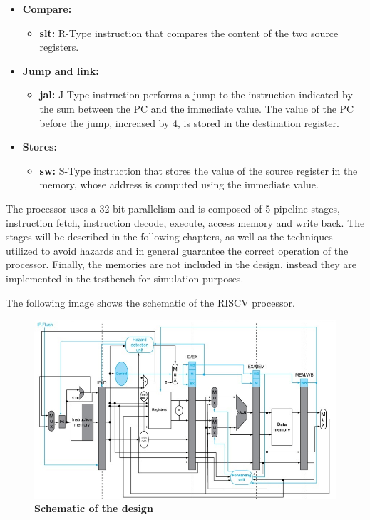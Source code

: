 \begin{itemize}
    \item \textbf{Compare:}
    \begin{itemize}
        \item \textbf{slt:} R-Type instruction that compares the content of the two source registers.
    \end{itemize}
    \item \textbf{Jump and link:}
    \begin{itemize}
        \item \textbf{jal:} J-Type instruction performs a jump to the instruction indicated by the sum between the PC and the immediate value. The value of the PC before the jump, 
        increased by 4, is stored in the destination register.
    \end{itemize}
    \item \textbf{Stores:}
    \begin{itemize}
        \item \textbf{sw:} S-Type instruction that stores the value of the source register in the memory, whose address is computed using the immediate value.
    \end{itemize}
\end{itemize}

    The processor uses a 32-bit parallelism and is composed of 5 pipeline stages, instruction fetch, instruction decode, execute, access memory and write back.
    The stages will be described in the following chapters, as well as the techniques utilized to avoid hazards and in general guarantee the correct operation of the processor. 
    Finally, the memories are not included in the design, instead they are implemented in the testbench for simulation purposes.

    The following image shows the schematic of the RISCV processor.
    \begin{figure}[!h]
        \centering
            \includegraphics[width=\linewidth]{schematic/schematic.jpg}
            \caption{\textbf{Schematic of the design}}
    \end{figure}
        